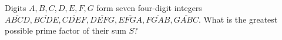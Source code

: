 Digits $A,B,C,D,E,F,G$ form seven four-digit integers $\overline{ABCD},\overline{BCDE},\overline{CDEF},\overline{DEFG},\overline{EFGA},\overline{FGAB},\overline{GABC}$. What is the greatest possible prime factor of their sum $S$?
